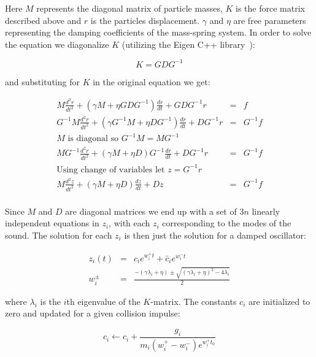 \documentclass{article}
\begin{document}
  Here $M$ represents the diagonal matrix of particle masses, $K$ is the force
  matrix described above and $r$ is the particles displacement. $\gamma$ and
  $\eta$ are free parameters representing the damping coefficients of the
  mass-spring system. In order to solve the equation we diagonalize $K$
  (utilizing the Eigen C++ library~\cite{Eigen}):

  $$
    K = GDG^{-1}
  $$

  and substituting for $K$ in the original equation we get:

  $$
    \begin{array}{ccc}
      M\frac{d^2 r}{dt^2} + (\gamma M + \eta GDG^{-1}) \frac{dr}{dt} + GDG^{-1}r & = & f \\[11pt]
      G^{-1} M\frac{d^2 r}{dt^2} + (\gamma G^{-1} M + \eta DG^{-1}) \frac{dr}{dt} + DG^{-1}r & = & G^{-1} f \\[11pt]
      \textrm{$M$ is diagonal so } G^{-1}M = MG^{-1} & & \\[11pt]
      M G^{-1} \frac{d^2 r}{dt^2} + (\gamma M + \eta D)G^{-1} \frac{dr}{dt} + DG^{-1}r & = & G^{-1} f \\[11pt]
      \textrm{Using change of variables let } z = G^{-1} r & & \\[11pt]
      M \frac{d^2 z}{dt^2} + (\gamma M + \eta D) \frac{dz}{dt} + Dz & = & G^{-1} f \\[11pt]
    \end{array}
  $$

  Since $M$ and $D$ are diagonal matrices we end up with a set of $3n$ linearly
  independent equations in $z_i$, with each $z_i$ corresponding to the modes of
  the sound. The solution for each $z_i$ is then just the solution for a damped
  oscillator:

  $$
    \begin{array}{ccc}
      z_{i}(t) & = & c_{i} e^{w_{i}^{+}t} + \bar{c}_{i} e^{w_{i}^{-}t} \\[11pt] 
      w_{i}^{\pm} & = & \frac{-(\gamma \lambda_{i} + \eta) \pm \sqrt{(\gamma \lambda_{i} + \eta)^2 - 4 \lambda_{i}}}{2}
    \end{array}
  $$

  where $\lambda_i$ is the $i$th eigenvalue of the $K$-matrix. The constants
  $c_i$ are initialized to zero and updated for a given collision impulse:

  $$
    c_{i} \gets c_{i} + \frac{g_{i}}{m_{i} (w_{i}^{+} - w_{i}^{-}) e^{w_{i}^{+} t_{0}}}
  $$
\end{document}
